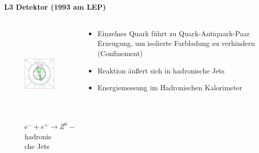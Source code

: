 \begin{iframe}
	\framesubtitle{L3 Detektor (1993 am LEP)}

\begin{columns}
		\begin{column}{0.40\textwidth}
	\begin{figure}
		\includegraphics[height=4.70cm]{img/hadron}
		\caption*{$e^- +e^+ \rightarrow Z^0 \rightarrow$ hadronische Jets \cite{huz0}}
	\end{figure}
\end{column}
		\begin{column}{0.58\textwidth}
			\begin{itemize}
				\item Einzelnes Quark führt zu Quark-Antiquark-Paar Erzeugung, um isolierte Farbladung zu verhindern (Confinement)
				\item Reaktion äußert sich in hadronische Jets
				\item Energiemessung im Hadronischen Kalorimeter
			\end{itemize}
\end{column}
\end{columns}
\end{iframe}

